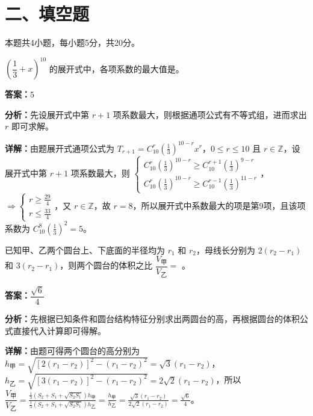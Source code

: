 \section*{二、填空题}
本题共4小题，每小题5分，共20分。

\begin{question}[points=5]
$\left(\dfrac{1}{3}+x\right)^{10}$ 的展开式中，各项系数的最大值是。
\fillin[{$5$}]
\begin{solution}
\textbf{答案：}$5$

\textbf{分析：}先设展开式中第 $r+1$ 项系数最大，则根据通项公式有不等式组，进而求出 $r$ 即可求解。

\textbf{详解：}由题展开式通项公式为 $T_{r+1}=C_{10}^r\left(\frac{1}{3}\right)^{10-r}x^r$，$0\le r\le10$ 且 $r\in\mathbb{Z}$，设展开式中第 $r+1$ 项系数最大，则 $\begin{cases} C_{10}^r\left(\frac{1}{3}\right)^{10-r}\ge C_{10}^{r+1}\left(\frac{1}{3}\right)^{9-r} \\ C_{10}^r\left(\frac{1}{3}\right)^{10-r}\ge C_{10}^{r-1}\left(\frac{1}{3}\right)^{11-r} \end{cases}$，$\Rightarrow\begin{cases} r\ge\frac{29}{4} \\ r\le\frac{33}{4} \end{cases}$，又 $r\in\mathbb{Z}$，故 $r=8$，所以展开式中系数最大的项是第9项，且该项系数为 $C_{10}^8\left(\frac{1}{3}\right)^2=5$。
\end{solution}
\end{question}

\begin{question}[points=5]
已知甲、乙两个圆台上、下底面的半径均为 $r_1$ 和 $r_2$，母线长分别为 $2(r_2-r_1)$ 和 $3(r_2-r_1)$，则两个圆台的体积之比 $\dfrac{V_{\text{甲}}}{V_{\text{乙}}}=$ 。
\begin{solution}
\textbf{答案：}$\dfrac{\sqrt{6}}{4}$

\textbf{分析：}先根据已知条件和圆台结构特征分别求出两圆台的高，再根据圆台的体积公式直接代入计算即可得解。

\textbf{详解：}由题可得两个圆台的高分别为 $h_{\text{甲}}=\sqrt{[2(r_1-r_2)]^2-(r_1-r_2)^2}=\sqrt{3}(r_1-r_2)$，$h_{\text{乙}}=\sqrt{[3(r_1-r_2)]^2-(r_1-r_2)^2}=2\sqrt{2}(r_1-r_2)$，所以 $\dfrac{V_{\text{甲}}}{V_{\text{乙}}}=\frac{\frac{1}{3}(S_2+S_1+\sqrt{S_2S_1})h_{\text{甲}}}{\frac{1}{3}(S_2+S_1+\sqrt{S_2S_1})h_{\text{乙}}}=\frac{h_{\text{甲}}}{h_{\text{乙}}}=\frac{\sqrt{3}(r_1-r_2)}{2\sqrt{2}(r_1-r_2)}=\frac{\sqrt{6}}{4}$。
\end{solution}
\end{question}

